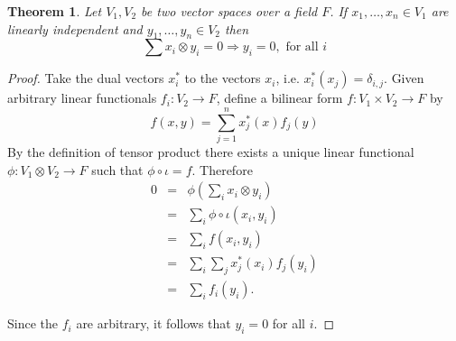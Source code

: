 \documentclass[12pt]{article}
\newtheorem{theorem}{Theorem}
\begin{document}
\begin{theorem}
 Let $V_1,V_2$ be two vector spaces over a field $F$.
 If $x_1,\ldots,x_n\in V_1$ are linearly independent and $y_1,\ldots,y_n\in V_2$ then
$$
\sum x_i \otimes y_i =0 \Rightarrow y_i=0,\mbox{ for all } i$$\end{theorem}
\begin{proof}
 Take the dual vectors $x_i^{*}$ to the vectors $x_i$, i.e. $x_i^{*}(x_j)=\delta_{i,j}$. Given arbitrary linear functionals $f_i:V_2 \rightarrow F$, define a bilinear form $f:V_1\times V_2\rightarrow F$ by
$$ f(x,y)=\sum_{j=1}^n x_{j}^{*}(x)f_j(y)$$
 By the definition of tensor product there exists a unique linear functional $\phi:V_1\otimes V_2\rightarrow F$ such that $\phi \circ \iota =f$. Therefore
\begin{eqnarray*} 
0&=&\phi\left(\sum_{i} x_i\otimes y_i\right) \\
&=&\sum_{i} \phi\circ \iota (x_i,y_i) \\
 &=&\sum_{i} f(x_i,y_i) \\
&=&\sum_i \sum_j x_{j}^{*}(x_i)f_j(y_i)\\
& =&\sum_{i} f_i(y_i).
\end{eqnarray*}

 Since the $f_i$ are arbitrary, it follows that $y_i=0$ for all $i$.


\end{proof}
\end{document}
